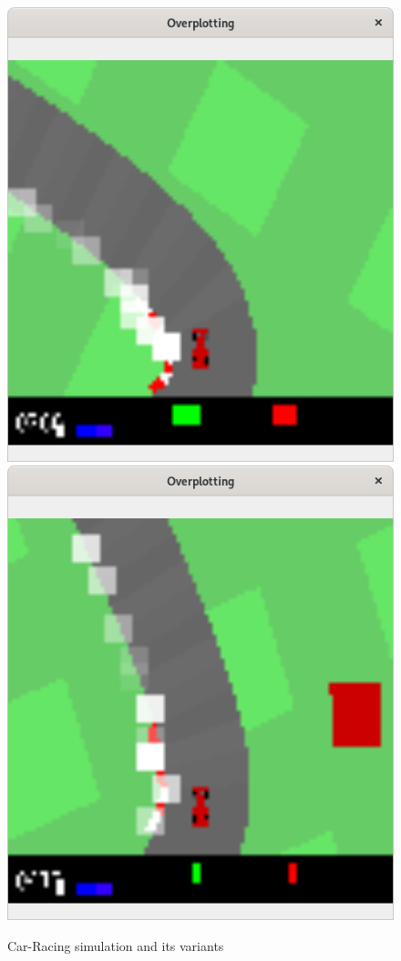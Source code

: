\documentclass[10pt,twocolumn,letterpaper]{article}
\begin{document}
\begin{figure}[h]
    \includegraphics[scale=0.24]{images/intro1.png}
    \includegraphics[scale=0.24]{images/intro2.png}
    \caption{Car-Racing simulation and its variants}
    \label{fig:intro}
\end{figure}
\end{document}

